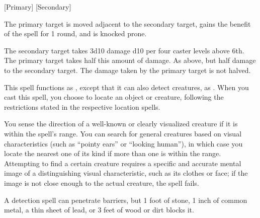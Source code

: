 \begin{spellheader}
    \spellrng{\rngclose}
    [Primary]
    [Secondary]
\end{spellheader}
\begin{spelleffects}
    \spelleffect The primary target is moved adjacent to the secondary target, gains the benefit of the  spell for 1 round, and is knocked prone.
    \begin{spellmargin}
        \spellsuccess The secondary target takes 3d10 damage \add d10 per four caster levels above 6th. The primary target takes half this amount of damage.
        \spellfailure As above, but half damage to the secondary target. The damage taken by the primary target is not halved.
    \end{spellmargin}
\end{spelleffects}
\begin{spellfooter}
    
\end{spellfooter}

\begin{spellheader}
\end{spellheader}
\spellrng{\rngext}
\spelldur{\durlong \dismissable}
\spelleffect This spell functions as , except that it can also detect creatures, as . When you cast this spell, you choose to locate an object or creature, following the restrictions stated in the respective location spells.

\begin{spellheader}
    \spellrng{\rnglong}
\end{spellheader}
\begin{spelleffects}
    \spelldur{\durmed \dismissable}
    \spelleffect You sense the direction of a well-known or clearly visualized creature if it is within the spell's range. You can search for general creatures based on visual characteristics (such as ``pointy ears'' or ``looking human''), in which case you locate the nearest one of its kind if more than one is within the range. Attempting to find a certain creature requires a specific and accurate mental image of a distinguishing visual characteristic, such as its clothes or face; if the image is not close enough to the actual creature, the spell fails.
\end{spelleffects}
\begin{spellfooter}
    \spellnotes A detection spell can penetrate barriers, but 1 foot of stone, 1 inch of common metal, a thin sheet of lead, or 3 feet of wood or dirt blocks it.
\end{spellfooter}

